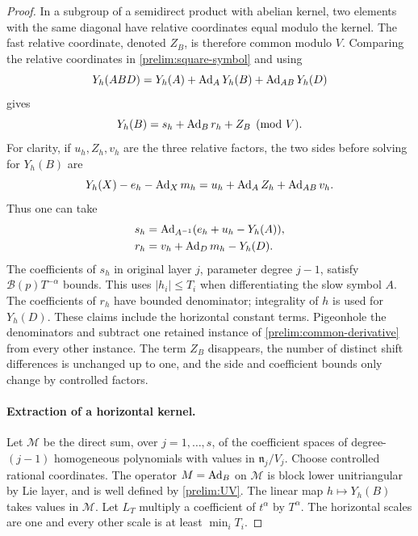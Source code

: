 \begin{proof}
In a subgroup of a semidirect product with abelian kernel, two
elements with the same diagonal have relative coordinates equal
modulo the kernel.  The fast relative coordinate, denoted $Z_B$,
is therefore common modulo $V$.  Comparing the relative
coordinates in \eqref{prelim:square-symbol} and using
\[
 Y_h(ABD)=Y_h(A)+\operatorname{Ad}_A Y_h(B)+\operatorname{Ad}_{AB}Y_h(D)
\]
gives
\begin{equation}\label{prelim:common-derivative}
 Y_h(B)=s_h+\operatorname{Ad}_Br_h+Z_B\pmod V.
\end{equation}
For clarity, if $u_h,Z_h,v_h$ are the three relative factors,
the two sides before solving for $Y_h(B)$ are
\[
 Y_h(X)-e_h-\operatorname{Ad}_Xm_h
       =u_h+\operatorname{Ad}_AZ_h+\operatorname{Ad}_{AB}v_h.
\]
Thus one can take
\[
 \begin{split}
 s_h&=\operatorname{Ad}_{A^{-1}}(e_h+u_h-Y_h(A)),\\
 r_h&=v_h+\operatorname{Ad}_Dm_h-Y_h(D).
 \end{split}
\]
The coefficients of $s_h$ in original layer $j$, parameter degree
$j-1$, satisfy $\mathcal B(p)T^{-\alpha}$ bounds.  This uses
$|h_i|\leq T_i$ when differentiating the slow symbol $A$.
The coefficients of $r_h$ have bounded denominator; integrality
of $h$ is used for $Y_h(D)$.  These claims include the horizontal
constant terms.  Pigeonhole the denominators and subtract one
retained instance of \eqref{prelim:common-derivative} from every
other instance.  The term $Z_B$ disappears, the number of distinct
shift differences is unchanged up to one, and the side and
coefficient bounds only change by controlled factors.

\paragraph{Extraction of a horizontal kernel.}
Let $\mathcal M$ be the direct sum, over $j=1,\ldots,s$, of
the coefficient spaces of degree-$(j-1)$ homogeneous polynomials
with values in $\mathfrak n_j/V_j$.  Choose controlled rational
coordinates.  The operator $M=\operatorname{Ad}_B$ on $\mathcal M$ is block
lower unitriangular by Lie layer, and is well defined by
\eqref{prelim:UV}.  The linear map $h\mapsto Y_h(B)$ takes
values in $\mathcal M$.  Let $L_T$ multiply a coefficient of
$t^\alpha$ by $T^\alpha$.  The horizontal scales are one and
every other scale is at least $\min_iT_i$.


\end{proof}
